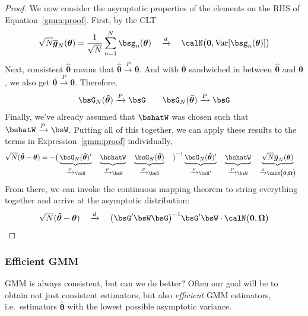 \documentclass[12pt]{article}
\theoremstyle{plain}
\theoremstyle{definition}
\theoremstyle{remark}
\newcommand{\bstheta}{\boldsymbol{\theta}}
\newcommand{\bsOmega}{\boldsymbol{\Omega}}
\newcommand{\bshattheta}{\boldsymbol{\hat{\theta}}}
\newcommand{\bsbartheta}{\boldsymbol{\bar{\theta}}}
\newcommand{\bsbarg}{\boldsymbol{\overline{g}}}
\renewcommand{\bso}{\boldsymbol{0}}
\newcommand{\Var}{\operatorname{Var}}
\newcommand{\pto}{\xrightarrow{P}}
\newcommand{\dto}{\xrightarrow{d}}
\newcommand{\sumnN}{\sum^N_{n=1}}
\begin{document}
\begin{proof}
We now consider the asymptotic properties of the elements on the RHS of
Equation~\ref{gmm:proof}. First, by the CLT
\begin{align*}
  \sqrt{N}
  \bsbarg_N(\bstheta)
  =
  \frac{1}{\sqrt{N}}
  \sumnN
  \bsg_n(\bstheta)
  \quad\dto\quad
  \calN\big(\bso,\Var[\bsg_n(\bstheta)]\big)
\end{align*}
Next, consistent $\bshattheta$ means that $\bshattheta\pto\bstheta$. And
with $\bsbartheta$ sandwiched in between $\bshattheta$ and $\bstheta$,
we also get $\bsbartheta\pto\bstheta$. Therefore,
\begin{align*}
  \bsG_N(\bshattheta)
  \pto \bsG
  \qquad
  \bsG_N(\bsbartheta)
  \pto \bsG
\end{align*}
Finally, we've already assumed that $\bshatW$ was chosen such that
$\bshatW\pto \bsW$. Putting all of this together, we can apply these
results to the terms in Expression~\ref{gmm:proof} individually,
\begin{align*}
  \sqrt{N}(\bshattheta-\bstheta)
  &=
  -
  \big(
  \underbrace{%
    \bsG_N(\bshattheta)'
  }_{%
    \pto \bsG
  }
  \quad
  \underbrace{%
    \bshatW
    \vphantom{\bsG(\bshattheta)'}
  }_{%
    \pto\bsW
  }
  \quad
  \underbrace{%
    \bsG_N(\bsbartheta)
  }_{%
    \pto \bsG
    \vphantom{\bsG(\bshattheta)'}
  }
  \quad
  \big)^{-1}
  \underbrace{%
    \bsG_N(\bshattheta)'
  }_{%
    \pto \bsG'
    \vphantom{\bsG(\bshattheta)'}
  }
  \quad
  \underbrace{%
    \bshatW
    \vphantom{\bsG(\bshattheta)'}
  }_{%
    \pto\bsW
  }
  \quad
  \underbrace{%
  \sqrt{N}
  \bsbarg_N(\bstheta)
  }_{\dto\calN\big(\bso,\bsOmega\big)}
\end{align*}
From there, we can invoke the continuous mapping theorem to string
everything together and arrive at the asymptotic distribution:
\begin{align*}
  \sqrt{N}(\bshattheta-\bstheta)
  \quad\dto\quad
  \big( \bsG' \bsW \bsG\big)^{-1}
  \bsG' \bsW
  \cdot
  \calN\big(\bso,\bsOmega\big)
\end{align*}
\end{proof}


\clearpage
\subsubsection{Efficient GMM}

GMM is always consistent, but can we do better?
Often our goal will be to obtain not just consistent estimators, but
also \emph{efficient} GMM estimators, i.e.\ estimators $\bshattheta$
with the lowest possible asymptotic variance.
\end{document}
